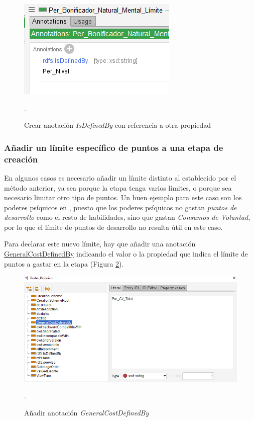 \begin{enumerate}
    \begin{figure}[H]
        \centering
        \includegraphics[scale=0.6]{Figures/Protege/MultipleChoice_4.png}
        \caption{Crear anotación \textit{IsDefinedBy} con referencia a otra propiedad}.
        \label{MultipleChoice_4}
    \end{figure}
\end{enumerate}

\subsubsection{Añadir un límite específico de puntos a una etapa de creación}\label{SpecificLimit}
En algunos casos es necesario añadir un límite distinto al establecido por el método anterior, ya sea porque la etapa tenga varios 
límites, o porque sea necesario limitar otro tipo de puntos. Un buen ejemplo para este caso son los poderes psíquicos en \anima, 
puesto que los poderes psíquicos no gastan \textit{puntos de desarrollo} como el resto de habilidades, sino que gastan 
\textit{Consumos de Voluntad}, por lo que el límite de puntos de desarrollo no resulta útil en este caso.\medskip

Para declarar este nuevo límite, 
hay que añadir una anotación \underline{GeneralCostDefinedBy} indicando el valor o la propiedad que indica el 
límite de puntos a gastar en la etapa (Figura \ref*{MultipleChoiceGroupCost_1}).

\begin{figure}[H]
    \centering
    \includegraphics[scale=0.6]{Figures/Protege/MultipleChoiceGroupCost_1.png}
    \caption{Añadir anotación \textit{GeneralCostDefinedBy}}.
    \label{MultipleChoiceGroupCost_1}
\end{figure}

